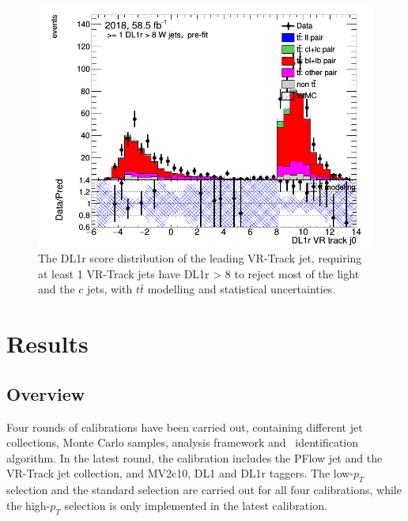 \begin{figure}[bth]
    \centering
\includegraphics[width=.45\textwidth]{FTAG_plots/3bplots/3bplots.png}
	\caption{The DL1r score distribution of the leading VR-Track jet, 
	requiring at least 1 VR-Track jets have DL1r > 8 to reject most of 
	the light and the $c$ jets, with $t\bar{t}$ modelling and statistical uncertainties. }
    \label{fig:3bplots}
\end{figure}


\section{Results}
\label{result}


\subsection{Overview}
Four rounds of calibrations have been carried out, containing different 
jet collections, Monte Carlo samples, analysis framework 
and \bjet\ identification algorithm. 
In the latest round, 
the calibration includes the PFlow jet and the VR-Track jet collection, 
and MV2c10, DL1 and DL1r taggers. The low-$p_T$ 
selection and the standard selection are carried out for all four 
calibrations, while the high-$p_T$ selection is only implemented 
in the latest calibration. 

